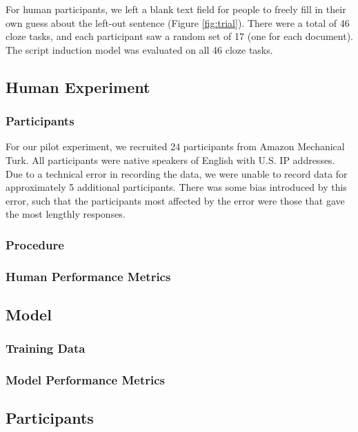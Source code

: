 \documentclass[10pt,a4paper]{article}
\begin{document}
For human participants, we left a blank text field for people to freely fill in their own guess about the left-out sentence (Figure \ref{fig:trial}).
There were a total of 46 cloze tasks, and each participant saw a random set of 17 (one for each document).
The script induction model was evaluated on all 46 cloze tasks.

\subsection{Human Experiment}

\subsubsection{Participants}

For our pilot experiment, we recruited
24 participants from Amazon Mechanical Turk.
All participants were native speakers of English with U.S. IP addresses.
Due to a technical error in recording the data, we were unable to record data for approximately 5 additional participants.
There was some bias introduced by this error, such that the participants most affected by the error were those that gave the most lengthly responses.

\subsubsection{Procedure}

\subsubsection{Human Performance Metrics}

\subsection{Model}

\subsubsection{Training Data}

\subsubsection{Model Performance Metrics}

\subsection{Participants}
\end{document}
